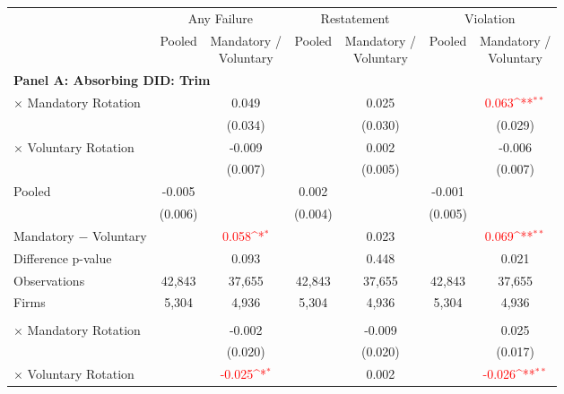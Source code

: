 \documentclass[10pt]{article}
\newcommand{\sym}[1]{\textsuperscript{#1}}
\begin{document}
\begin{minipage}{19cm}\fontsize{10}{12}\selectfont\setlength{\tabcolsep}{4pt}\renewcommand{\arraystretch}{1.12}


\def\sym#1{\ifmmode^{#1}\else\(^{#1}\)\fi}
\centering
{}
\label{tab:absorbing-transition-master-plus-upgrade-no-auditfirm-fe}
\begin{threeparttable}

\begin{tabular}{l cc cc cc}
\toprule
 & \multicolumn{2}{c}{Any Failure} & \multicolumn{2}{c}{Restatement} & \multicolumn{2}{c}{Violation} \\
\cmidrule(lr){2-3}\cmidrule(lr){4-5}\cmidrule(lr){6-7}
 & Pooled & \shortstack{Mandatory /\\Voluntary} & Pooled & \shortstack{Mandatory /\\Voluntary} & Pooled & \shortstack{Mandatory /\\Voluntary} \\
\midrule
\multicolumn{7}{l}{\textbf{Panel A: Absorbing DID: Trim}} \\
$\times$ Mandatory Rotation &  & 0.049 &  & 0.025 &  & \textcolor{red}{0.063\sym{**}} \\
 &  & (0.034) &  & (0.030) &  & (0.029) \\
$\times$ Voluntary Rotation &  & -0.009 &  & 0.002 &  & -0.006 \\
 &  & (0.007) &  & (0.005) &  & (0.007) \\
Pooled & -0.005 &  & 0.002 &  & -0.001 &  \\
 & (0.006) &  & (0.004) &  & (0.005) &  \\
Mandatory $-$ Voluntary &  & \textcolor{red}{0.058\sym{*}} &  & 0.023 &  & \textcolor{red}{0.069\sym{**}} \\
Difference p-value &  & 0.093 &  & 0.448 &  & 0.021 \\
Observations & 42,843 & 37,655 & 42,843 & 37,655 & 42,843 & 37,655 \\
Firms & 5,304 & 4,936 & 5,304 & 4,936 & 5,304 & 4,936 \\
\addlinespace
\multicolumn{7}{l}{\textbf{Panel B: Absorbing DID: Strict}} \\
$\times$ Mandatory Rotation &  & -0.002 &  & -0.009 &  & 0.025 \\
 &  & (0.020) &  & (0.020) &  & (0.017) \\
$\times$ Voluntary Rotation &  & \textcolor{red}{-0.025\sym{*}} &  & 0.002 &  & \textcolor{red}{-0.026\sym{**}} \\

\end{tabular}
\end{threeparttable}
\end{minipage}
\end{document}
